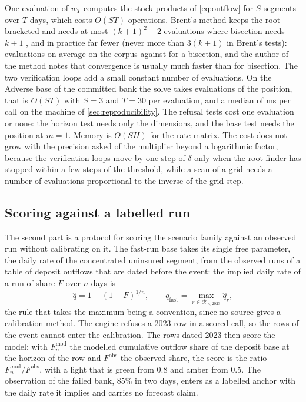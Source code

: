 One evaluation of $w_T$ computes the stock products of \cref{eq:outflow} for $S$ segments over $T$ days, which costs $O(ST)$ operations. Brent's method keeps the root bracketed and needs at most $(k+1)^2-2$ evaluations where bisection needs $k+1$ \citep[ch.~4, p.~53, eq.~3.4]{brent1973}, and in practice far fewer (never more than $3(k+1)$ in Brent's tests): \kPEvals{} evaluations on average on the corpus against \kNEvals{} for a bisection, and the author of the method notes that convergence is usually much faster than for bisection. The two verification loops add a small constant number of evaluations. On the Adverse base of the committed bank the solve takes \evalsSolve{} evaluations of the position, that is $O(ST)$ with $S=3$ and $T=30$ per evaluation, and a median of \timeAdvMs{} ms per call on the machine of \cref{sec:reproducibility}. The refusal tests cost one evaluation or none: the horizon test needs only the dimensions, and the base test needs the position at $m=1$. Memory is $O(SH)$ for the rate matrix. The cost does not grow with the precision asked of the multiplier beyond a logarithmic factor, because the verification loops move by one step of $\delta$ only when the root finder has stopped within a few steps of the threshold, while a scan of a grid needs a number of evaluations proportional to the inverse of the grid step.

\subsection{Scoring against a labelled run}

The second part is a protocol for scoring the scenario family against an observed run without calibrating on it. The fast-run base takes its single free parameter, the daily rate of the concentrated uninsured segment, from the observed runs of a table of deposit outflows that are dated before the event: the implied daily rate of a run of share $F$ over $n$ days is
\begin{equation}
\hat q=1-(1-F)^{1/n},\qquad q_{\mathrm{fast}}=\max_{r\in\mathcal R_{<2023}}\hat q_r,
\label{eq:implied-rate}
\end{equation}
the rule that takes the maximum being a convention, since no source gives a calibration method. The engine refuses a 2023 row in a scored call, so the rows of the event cannot enter the calibration. The rows dated 2023 then score the model: with $F^{\mathrm{mod}}_n$ the modelled cumulative outflow share of the deposit base at the horizon of the row and $F^{\mathrm{obs}}$ the observed share, the score is the ratio $F^{\mathrm{mod}}_n/F^{\mathrm{obs}}$, with a light that is green from 0.8 and amber from 0.5. The observation of the failed bank, 85\% in two days, enters as a labelled anchor with the daily rate it implies and carries no forecast claim.

